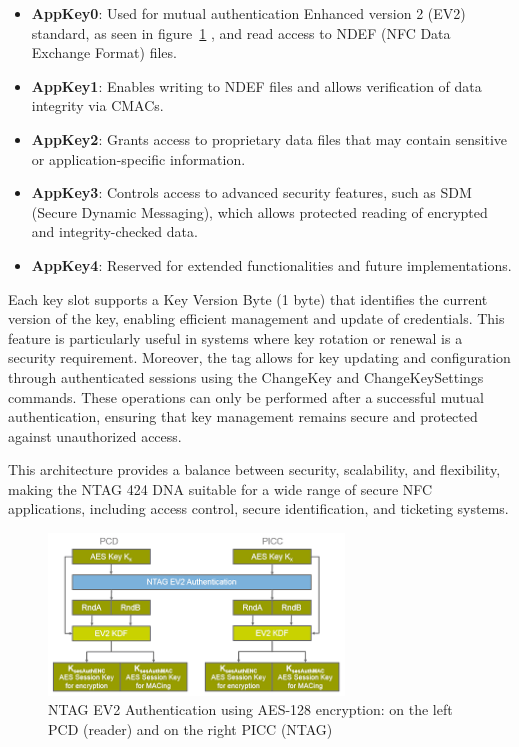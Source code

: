 \begin{itemize}
	\item \textbf{AppKey0}: Used for mutual authentication Enhanced version 2 (EV2) standard, as seen in figure~\ref{fig:ntag424_ev2} \cite{ref42}, and read access to NDEF (NFC Data Exchange Format) files.
	\item \textbf{AppKey1}: Enables writing to NDEF files and allows verification of data integrity via CMACs.
	\item \textbf{AppKey2}: Grants access to proprietary data files that may contain sensitive or application-specific information.
	\item \textbf{AppKey3}: Controls access to advanced security features, such as SDM (Secure Dynamic Messaging), which allows protected reading of encrypted and integrity-checked data.
	\item \textbf{AppKey4}: Reserved for extended functionalities and future implementations.
\end{itemize}

Each key slot supports a Key Version Byte (1 byte) that identifies the current version of the key, enabling efficient management and update of credentials. This feature is particularly useful in systems where key rotation or renewal is a security requirement. Moreover, the tag allows for key updating and configuration through authenticated sessions using the ChangeKey and ChangeKeySettings commands. These operations can only be performed after a successful mutual authentication, ensuring that key management remains secure and protected against unauthorized access.

This architecture provides a balance between security, scalability, and flexibility, making the NTAG 424 DNA suitable for a wide range of secure NFC applications, including access control, secure identification, and ticketing systems.

\begin{figure}[h!]
	\centering
	\includegraphics[width=0.7\textwidth]{imaxes/EV2ntag.png} %
	\caption{NTAG EV2 Authentication using AES-128 encryption: on the left PCD (reader) and on the right PICC (NTAG)}
	\label{fig:ntag424_ev2}
\end{figure}
